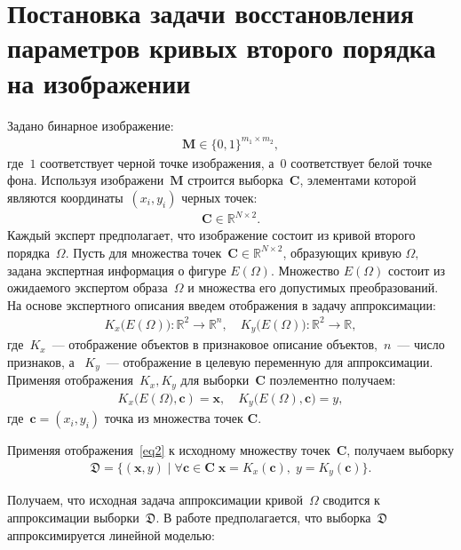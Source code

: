 \documentclass[12pt]{a&t}
\begin{document}
\section{Постановка задачи восстановления параметров кривых второго порядка на изображении}
Задано бинарное изображение:
\begin{gather}
\mathbf{M} \in \{0, 1 \}^{m_1\times m_2},
\end{gather}
где~$1$ соответствует черной точке изображения, а~$0$ соответствует белой точке фона.
Используя изображени~$\mathbf{M}$ строится выборка~$\mathbf{C}$, элементами которой являются координаты~$(x_i, y_i)$ черных точек:
\begin{gather}
\mathbf{C} \in \mathbb{R}^{N \times 2}.
\end{gather}
Каждый эксперт предполагает, что изображение состоит из кривой второго порядка~$\Omega$.
Пусть для множества точек~$\mathbf {C} \in \mathbb{R}^{N \times 2} $, образующих кривую $\Omega,$ задана экспертная информация о фигуре $E(\Omega)$.
Множество $E(\Omega)$ состоит из ожидаемого экспертом образа~$\Omega$ и множества его допустимых преобразований. На основе экспертного описания введем отображения в задачу аппроксимации:
\begin{gather}
\label{eq1}
	K_{x}\bigl(E(\Omega)\bigr): \mathbb{R}^{2} \rightarrow \mathbb{R}^{n}, \quad K_{y}\bigl(E(\Omega)\bigr): \mathbb{R}^{2} \rightarrow \mathbb{R},
\end{gather} 
где~$K_{x}$~--- отображение объектов в признаковое описание объектов,~$n$~--- число признаков, а ~$K_{y}$~---  отображение в целевую переменную для аппроксимации. Применяя отображения~$K_{x}, K_{y}$ для выборки~$\mathbf{C}$ поэлементно получаем:
\begin{gather}
\label{eq2}
	K_{x}\bigl(E(\Omega\bigr), \mathbf{c}) = \mathbf{x}, \quad  K_{y}\bigl(E(\Omega), \mathbf{c}\bigr) = y,
\end{gather}
где~$\mathbf{c} = (x_i, y_i)$ точка из множества точек $\mathbf{C}$.

Применяя отображения~\eqref{eq2} к исходному множеству точек~$\mathbf{C}$, получаем выборку
\begin{gather}
\label{eq4}
    \mathfrak{D} = \{(\mathbf{x}, y) \; | \; \forall \mathbf{c} \in \mathbf{C} \; \mathbf{x} = K_x(\mathbf{c}), \; y = K_y(\mathbf{c}) \}.
\end{gather}

Получаем, что исходная задача аппроксимации кривой~$\Omega$ сводится к аппроксимации выборки~$\mathfrak{D}$. В работе предполагается, что выборка~$\mathfrak{D}$ аппроксимируется линейной моделью:
\end{document}
